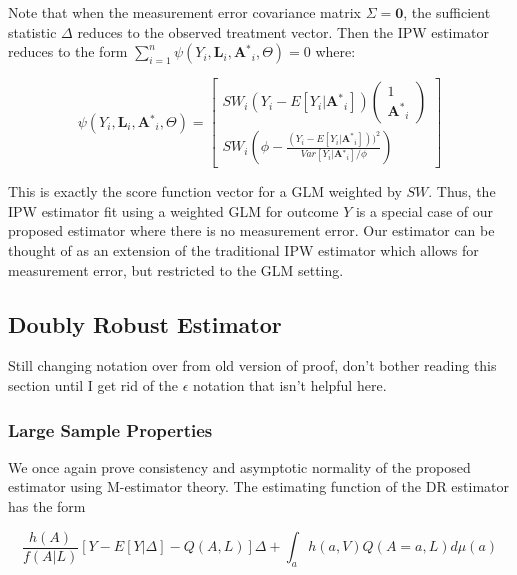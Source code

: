 \documentclass[12pt]{article}
\begin{document}
Note that when the measurement error covariance matrix $\Sigma = \textbf{0}$, the sufficient statistic $\Delta$ reduces to the observed treatment vector. Then the IPW estimator reduces to the form $\sum_{i=1}^{n} \psi(Y_{i}, \textbf{L}_{i}, \textbf{A$^{*}$}_{i}, \Theta) = 0$ where:

\begin{equation}
    \psi(Y_{i}, \textbf{L}_{i}, \textbf{A$^{*}$}_{i}, \Theta) =
    \begin{bmatrix}
       SW_{i}(Y_{i} - E[Y_{i} | \textbf{A$^{*}$}_{i}])
       \begin{pmatrix}
          1 \\
          \textbf{A$^{*}$}_{i}
       \end{pmatrix} \\
       SW_{i} \left ( \phi - \frac{(Y_{i} - E[Y_{i} | \textbf{A$^{*}$}_{i}]))^{2}}{Var[Y_{i} | \textbf{A$^{*}$}_{i}] / \phi} \right )
    \end{bmatrix}
\end{equation}

This is exactly the score function vector for a GLM weighted by $SW$. Thus, the IPW estimator fit using a weighted GLM for outcome $Y$ is a special case of our proposed estimator where there is no measurement error. Our estimator can be thought of as an extension of the traditional IPW estimator which allows for measurement error, but restricted to the GLM setting.

\subsection{Doubly Robust Estimator}

Still changing notation over from old version of proof, don't bother reading this section until I get rid of the $\epsilon$ notation that isn't helpful here.

\subsubsection{Large Sample Properties}

We once again prove consistency and asymptotic normality of the proposed estimator using M-estimator theory. The estimating function of the DR estimator has the form

\begin{equation}
\frac{h(A)}{f(A | L)}[Y - E[Y | \Delta] - Q(A, L)]\Delta + \int_{a} h(a, V)Q(A = a, L)d\mu (a)
\end{equation}
\end{document}
